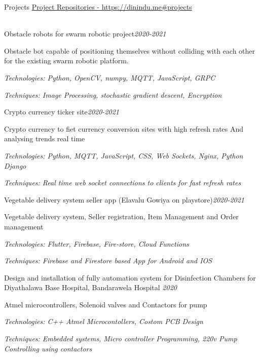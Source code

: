 \documentclass{resume} %
\begin{document}
\begin{rSection}{Projects}
\href{https://dinindu.me#projects}{Project Repositories - https://dinindu.me\#projects} \\ \\
\begin{rSubsection}{Obstacle robots for swarm robotic project}{\em {2020-2021}}{}{}
\item Obstacle bot capable of positioning themselves without colliding with each other for the existing swarm robotic platform. \item 
\textit{Technologies: Python, OpenCV, numpy, MQTT, JavaScript, GRPC}
\item \textit{Techniques: Image Processing, stochastic gradient descent, Encryption }
\end{rSubsection}

\begin{rSubsection}{Crypto currency ticker site}{\em {2020-2021}}{}{}
\item Crypto currency to fiet currency conversion sites with high refresh rates And analysing trends real time \item 
\textit{Technologies: Python, MQTT, JavaScript, CSS, Web Sockets, Nginx, Python Django}
\item \textit{Techniques: Real time web socket connections to clients for fast refresh rates}
\end{rSubsection}

\begin{rSubsection}{Vegetable delivery system seller app (Elavalu Gowiya on playstore)}{\em {2020-2021}}{}{}
\item Vegetable delivery system, Seller registration, Item Management and Order management \item 
\textit{Technologies: Flutter, Firebase, Fire-store, Cloud Functions}
\item \textit{Techniques: Firebase and Firestore based App for Android and IOS}
\end{rSubsection}

\begin{rSubsection}{Design and installation of fully automation system for Disinfection Chambers for Diyathalawa Base Hospital, Bandarawela Hospital }{\em {2020}}{}{}
\item Atmel microcontrollers, Solenoid valves and Contactors for pump \item 
\textit{Technologies: C++ Atmel Microcontollers, Costom PCB Design}
\item \textit{Techniques: Embedded systems, Micro controller Programming, 220v Pump Controlling using contactors}
\end{rSubsection}


\end{rSection}
\end{document}
